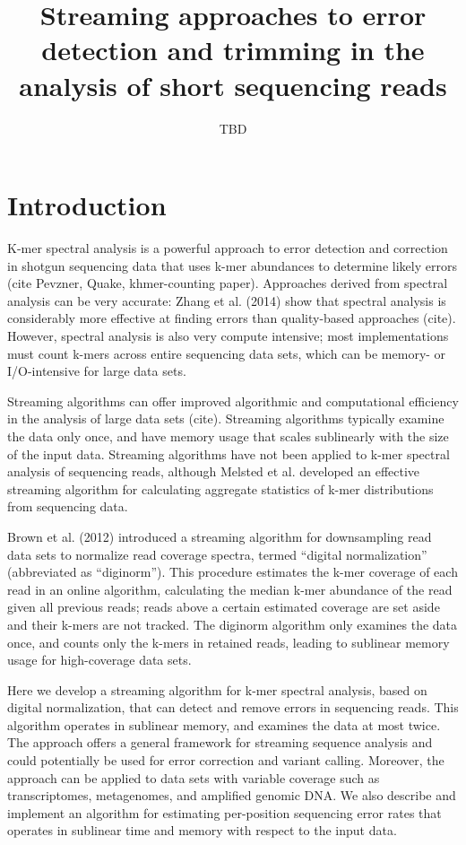 \documentclass{article}
\begin{document}
\title{Streaming approaches to error detection and trimming in the analysis of
short sequencing reads}
\author{TBD}
\maketitle

\section{Introduction}

K-mer spectral analysis is a powerful approach to error detection and
correction in shotgun sequencing data that uses k-mer abundances to
determine likely errors (cite Pevzner, Quake, khmer-counting paper).
Approaches derived from spectral analysis can be very accurate: Zhang
et al. (2014) show that spectral analysis is considerably more
effective at finding errors than quality-based approaches (cite).
However, spectral analysis is also very compute intensive; most
implementations must count k-mers across entire sequencing data sets,
which can be memory- or I/O-intensive for large data sets.

Streaming algorithms can offer improved algorithmic and computational
efficiency in the analysis of large data sets (cite).  Streaming
algorithms typically examine the data only once, and have memory usage
that scales sublinearly with the size of the input data.  Streaming
algorithms have not been applied to k-mer spectral analysis of
sequencing reads, although Melsted et al. developed an effective
streaming algorithm for calculating aggregate statistics of k-mer
distributions from sequencing data.

Brown et al. (2012) introduced a streaming algorithm for downsampling
read data sets to normalize read coverage spectra, termed ``digital
normalization'' (abbreviated as ``diginorm'').  This procedure
estimates the k-mer coverage of each read in an online algorithm,
calculating the median k-mer abundance of the read given all previous
reads; reads above a certain estimated coverage are set aside and
their k-mers are not tracked.  The diginorm algorithm only examines
the data once, and counts only the k-mers in retained reads, leading
to sublinear memory usage for high-coverage data sets.

Here we develop a streaming algorithm for k-mer spectral analysis,
based on digital normalization, that can detect and remove errors in
sequencing reads.  This algorithm operates in sublinear memory, and
examines the data at most twice.  The approach offers a general
framework for streaming sequence analysis and could potentially be
used for error correction and variant calling.  Moreover, the approach
can be applied to data sets with variable coverage such as
transcriptomes, metagenomes, and amplified genomic DNA.  We also
describe and implement an algorithm for estimating per-position
sequencing error rates that operates in sublinear time and memory with
respect to the input data.
\end{document}
